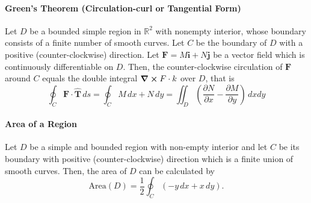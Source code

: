 \paragraph{Green's Theorem (Circulation-curl or Tangential Form)}
Let \(D\) be a bounded simple region in \(\mathbb R^2\) with nonempty interior, whose boundary consists of a finite number of smooth curves. Let \(C\) be the boundary of \(D\) with a positive (counter-clockwise) direction. Let \(\textbf{F} = M\textbf{i} + N\textbf{j}\) be a vector field which is continuously differentiable on \(D\). Then, the counter-clockwise circulation of \(\textbf{F}\) around \(C\) equals the double integral \(\curl F \cdot k\) over \(D\), that is
\[\oint_C \textbf{F} \cdot \hat{\textbf{T}} \, ds = \oint_C M \, dx + N \, dy = \iint_D \left(\frac{\partial N}{\partial x} - \frac{\partial M}{\partial y} \right) \, dxdy\]

\paragraph{Area of a Region}
Let \(D\) be a simple and bounded region with non-empty interior and let \(C\) be its boundary with positive (counter-clockwise) direction which is a finite union of smooth curves. Then, the area of \(D\) can be calculated by 
\[\text{Area}(D) = \frac{1}{2}\oint_C (-y \, dx + x \, dy).\]